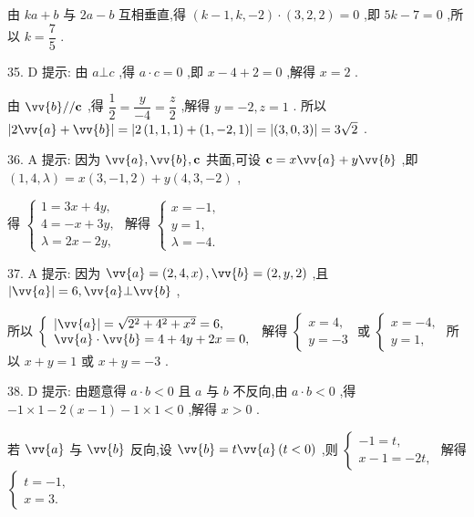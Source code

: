 由 ${ka} + b$ 与 ${2a} - b$ 互相垂直,得 $\left( {k - 1,k, - 2}\right)  \cdot  \left( {3,2,2}\right)  = 0$ ,即 ${5k} - 7 = 0$ ,所以 $k = \dfrac{7}{5}$ .

35. D 提示: 由 $a \bot  c$ ,得 $a \cdot  c = 0$ ,即 $x - 4 + 2 = 0$ ,解得 $x = 2$ .

由 $\vv{b}//\mathbf{c}$ ,得 $\dfrac{1}{2} = \dfrac{y}{-4} = \dfrac{z}{2}$ ,解得 $y =  - 2,z = 1$ . 所以 $\left| {2\vv{a} + \vv{b}}\right|  = \left| {2\left( {1,1,1}\right)  + \left( {1, - 2,1}\right) }\right|  = \left| \left( {3,0,3}\right) \right|  = 3\sqrt{2}$ .

36. A 提示: 因为 $\vv{a},\vv{b},\mathbf{c}$ 共面,可设 $\mathbf{c} = x\vv{a} + y\vv{b}$ ,即 $\left( {1,4,\lambda }\right)  = x\left( {3, - 1,2}\right)  + y\left( {4,3, - 2}\right)$ ,

得 $\left\{  \begin{array}{l} 1 = {3x} + {4y}, \\  4 =  - x + {3y}, \\  \lambda  = {2x} - {2y}, \end{array}\right.$ 解得 $\left\{  \begin{array}{l} x =  - 1, \\  y = 1, \\  \lambda  =  - 4. \end{array}\right.$

37. A 提示: 因为 $\vv{a} = \left( {2,4,x}\right) ,\vv{b} = \left( {2,y,2}\right)$ ,且 $\left| \vv{a}\right|  = 6,\vv{a}\bot \vv{b}$ ,

所以 $\left\{  \begin{array}{l} \left| \vv{a}\right|  = \sqrt{{2}^{2} + {4}^{2} + {x}^{2}} = 6, \\  \vv{a} \cdot  \vv{b} = 4 + {4y} + {2x} = 0, \end{array}\right.$ 解得 $\left\{  \begin{array}{l} x = 4, \\  y =  - 3 \end{array}\right.$ 或 $\left\{  \begin{array}{l} x =  - 4, \\  y = 1, \end{array}\right.$ 所以 $x + y = 1$ 或 $x + y =  - 3$ .

38. D 提示: 由题意得 $a \cdot  b < 0$ 且 $a$ 与 $b$ 不反向,由 $a \cdot  b < 0$ ,得 $- 1 \times  1 - 2\left( {x - 1}\right)  - 1 \times  1 < 0$ ,解得 $x > 0$ .

若 $\vv{a}$ 与 $\vv{b}$ 反向,设 $\vv{b} = t\vv{a}\left( {t < 0}\right)$ ,则 $\left\{  \begin{array}{l}  - 1 = t, \\  x - 1 =  - {2t}, \end{array}\right.$ 解得 $\left\{  \begin{array}{l} t =  - 1, \\  x = 3. \end{array}\right.$

